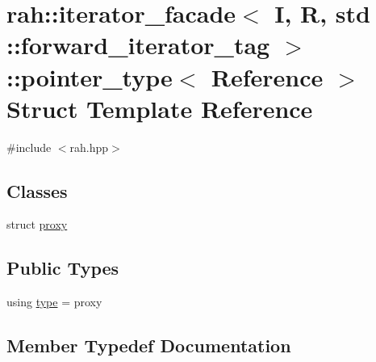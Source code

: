 \hypertarget{structrah_1_1iterator__facade_3_01_i_00_01_r_00_01std_01_1_1forward__iterator__tag_01_4_1_1pointer__type}{}\section{rah\+::iterator\+\_\+facade$<$ I, R, std \+::forward\+\_\+iterator\+\_\+tag $>$\+::pointer\+\_\+type$<$ Reference $>$ Struct Template Reference}
\label{structrah_1_1iterator__facade_3_01_i_00_01_r_00_01std_01_1_1forward__iterator__tag_01_4_1_1pointer__type}


{\ttfamily \#include $<$rah.\+hpp$>$}

\subsection*{Classes}
\begin{DoxyCompactItemize}
\item 
struct \mbox{\hyperlink{structrah_1_1iterator__facade_3_01_i_00_01_r_00_01std_01_1_1forward__iterator__tag_01_4_1_1pointer__type_1_1proxy}{proxy}}
\end{DoxyCompactItemize}
\subsection*{Public Types}
\begin{DoxyCompactItemize}
\item 
using \mbox{\hyperlink{structrah_1_1iterator__facade_3_01_i_00_01_r_00_01std_01_1_1forward__iterator__tag_01_4_1_1pointer__type_a487aadc79237b4647ac568b4bbf6c45f}{type}} = proxy
\end{DoxyCompactItemize}


\subsection{Member Typedef Documentation}
\mbox{\label{structrah_1_1iterator__facade_3_01_i_00_01_r_00_01std_01_1_1forward__iterator__tag_01_4_1_1pointer__type_a487aadc79237b4647ac568b4bbf6c45f}} 
